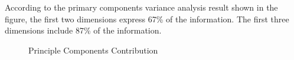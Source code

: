According to the primary components variance analysis result shown in the figure, the first two dimensions express 67\% of the information. The first three dimensions include 87\% of the information.

\begin{figure}[H]
    \centering  %
    \caption[Principle Components Contribution]{Principle Components Contribution}    %
    \label{principlecomponentcontribution}    %
\end{figure}


